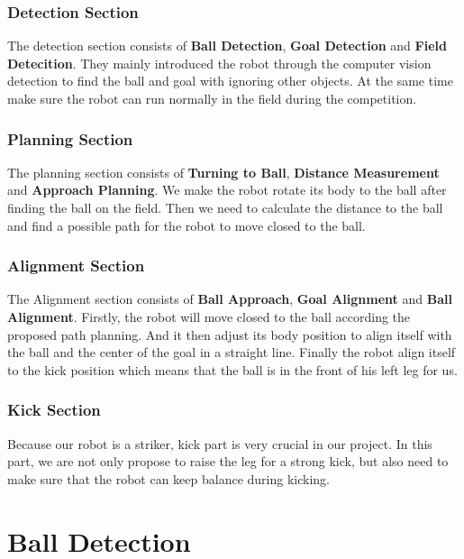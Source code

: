 \subsubsection*{Detection Section} 
The detection section consists of \textbf{Ball Detection}, \textbf{Goal Detection} and \textbf{Field Detecition}. They mainly introduced the robot through the computer vision detection to find the ball and goal with ignoring other objects. At the same time make sure the robot can run normally in the field during the competition. \\

\subsubsection*{Planning Section} 
The planning section consists of \textbf{Turning to Ball}, \textbf{Distance Measurement} and \textbf{Approach Planning}. We make the robot rotate its body to the ball after finding the ball on the field. Then we need to calculate the distance to the ball and find a possible path for the robot to move closed to the ball.\\


\subsubsection*{Alignment Section}
The Alignment section consists of \textbf{Ball Approach}, \textbf{Goal Alignment} and \textbf{Ball Alignment}. Firstly, the robot will move closed to the ball according the proposed path planning. And it then adjust its body position to align itself with the ball and the center of the goal in a straight line. Finally the robot align itself to the kick position which means that the ball is in the front of his left leg for us.\\

\subsubsection*{Kick Section}
Because our robot is a striker, kick part is very crucial in our project. In this part, we are not only propose to raise the leg for a strong kick, but also need to make sure that the robot can keep balance during kicking.\\




\section{Ball Detection}
\label{j sec distance measurement}
